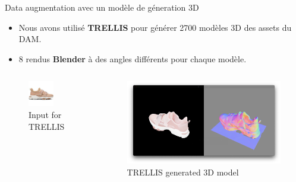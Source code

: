 \documentclass{beamer}
\begin{document}
\begin{frame}{Data augmentation avec un modèle de géneration 3D}
    \begin{itemize}
        \item Nous avons utilisé \textbf{TRELLIS} pour générer 2700 modèles 3D des assets du DAM.
        \item 8 rendus \textbf{Blender} à des angles différents pour chaque modèle.
    \end{itemize}
    
    \begin{columns}
        \begin{figure}
            \includegraphics[width=0.65\textwidth]{assets/trellis_input.png}
            \caption{Input for TRELLIS}
        \end{figure}
        \begin{figure}
            \includegraphics[width=1\textwidth]{assets/trellis_output.png}
            \caption{TRELLIS generated 3D model}
        \end{figure}
    \end{columns}
    
\end{frame}
\end{document}
